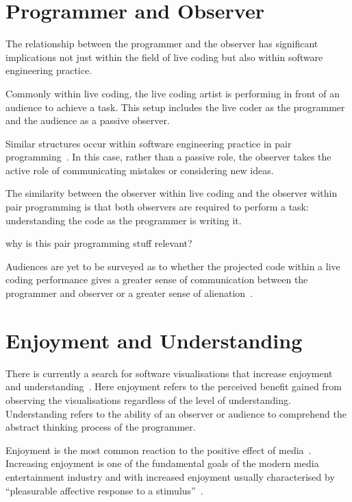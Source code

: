 \section{Programmer and Observer}

The relationship between the programmer and the observer has significant implications not just within the field of live coding but also within software engineering practice.

Commonly within live coding, the live coding artist is performing in front of an audience to achieve a task. This setup includes the live coder as the programmer and the audience as a passive observer. 

Similar structures occur within software engineering practice in pair programming~. In this case, rather than a passive role, the observer takes the active role of communicating mistakes or considering new ideas.

The similarity between the observer within live coding and the observer within pair programming is that both observers are required to perform a task: understanding the code as the programmer is writing it.

{\color{red} why is this pair programming stuff relevant?}

Audiences are yet to be surveyed as to whether the projected code within a live coding performance gives a greater sense of communication between the programmer and observer or a greater sense of alienation~\cite{Mclean2011}.

\more

\section{Enjoyment and Understanding}

There is currently a search for software visualisations that increase enjoyment and understanding~\cite{McLean2010a}. Here enjoyment refers to the perceived benefit gained from observing the visualisations regardless of the level of understanding. Understanding refers to the ability of an observer or audience to comprehend the abstract thinking process of the programmer.

Enjoyment is the most common reaction to the positive effect of media~\cite{Vorderer2004}. Increasing enjoyment is one of the fundamental goals of the modern media entertainment industry and with increased enjoyment usually characterised by ``pleasurable affective response to a stimulus''~\cite{Brock2004}. 

